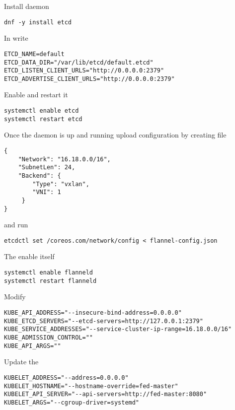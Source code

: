 Install  daemon

\begin{lstlisting}
dnf -y install etcd
\end{lstlisting}

In  write

\begin{lstlisting}
ETCD_NAME=default
ETCD_DATA_DIR="/var/lib/etcd/default.etcd"
ETCD_LISTEN_CLIENT_URLS="http://0.0.0.0:2379"
ETCD_ADVERTISE_CLIENT_URLS="http://0.0.0.0:2379"
\end{lstlisting}

Enable and restart it

\begin{lstlisting}
systemctl enable etcd
systemctl restart etcd
\end{lstlisting}

Once the daemon is up and running upload 
configuration by creating  file

\begin{lstlisting}
{
    "Network": "16.18.0.0/16",
    "SubnetLen": 24,
    "Backend": {
        "Type": "vxlan",
        "VNI": 1
     }
}
\end{lstlisting}

and run

\begin{lstlisting}
etcdctl set /coreos.com/network/config < flannel-config.json
\end{lstlisting}

The enable  itself

\begin{lstlisting}
systemctl enable flanneld
systemctl restart flanneld
\end{lstlisting}

Modify 

\label{kube-service-addresses}
\begin{lstlisting}
KUBE_API_ADDRESS="--insecure-bind-address=0.0.0.0"
KUBE_ETCD_SERVERS="--etcd-servers=http://127.0.0.1:2379"
KUBE_SERVICE_ADDRESSES="--service-cluster-ip-range=16.18.0.0/16"
KUBE_ADMISSION_CONTROL=""
KUBE_API_ARGS=""
\end{lstlisting}

Update the 

\begin{lstlisting}
KUBELET_ADDRESS="--address=0.0.0.0"
KUBELET_HOSTNAME="--hostname-override=fed-master"
KUBELET_API_SERVER="--api-servers=http://fed-master:8080"
KUBELET_ARGS="--cgroup-driver=systemd"
\end{lstlisting}

